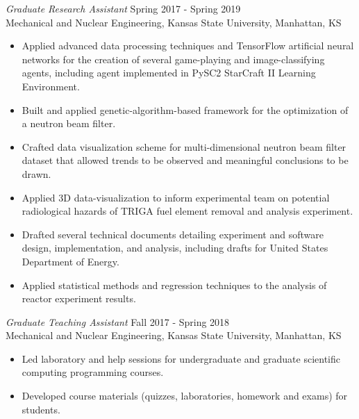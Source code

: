 \documentclass[margin, 10pt]{res} %
\begin{document}
\begin{resume}
{\sl Graduate Research Assistant} \hfill Spring 2017 - Spring 2019 \\
Mechanical and Nuclear Engineering, Kansas State University, Manhattan, KS
\begin{itemize}
    \item Applied advanced data processing techniques and TensorFlow artificial neural networks for the creation of several game-playing and image-classifying agents, including agent implemented in PySC2 StarCraft II Learning Environment.
    \item Built and applied genetic-algorithm-based framework for the optimization of a neutron beam filter.
    \item Crafted data visualization scheme for multi-dimensional neutron beam filter dataset that allowed trends to be observed and meaningful conclusions to be drawn.
    \item Applied 3D data-visualization to inform experimental team on potential radiological hazards of TRIGA fuel element removal and analysis experiment.
    \item Drafted several technical documents detailing experiment and software design, implementation, and analysis, including drafts for United States Department of Energy.
    \item Applied statistical methods and regression techniques to the analysis of reactor experiment results.
\end{itemize}

{\sl Graduate Teaching Assistant} \hfill Fall 2017 - Spring 2018 \\
Mechanical and Nuclear Engineering, Kansas State University, Manhattan, KS \\
\begin{itemize} \itemsep -2pt %
    \item Led laboratory and help sessions for undergraduate and graduate scientific computing programming courses.
    \item Developed course materials (quizzes, laboratories, homework and exams) for students.
\end{itemize}



\end{resume}
\end{document}
